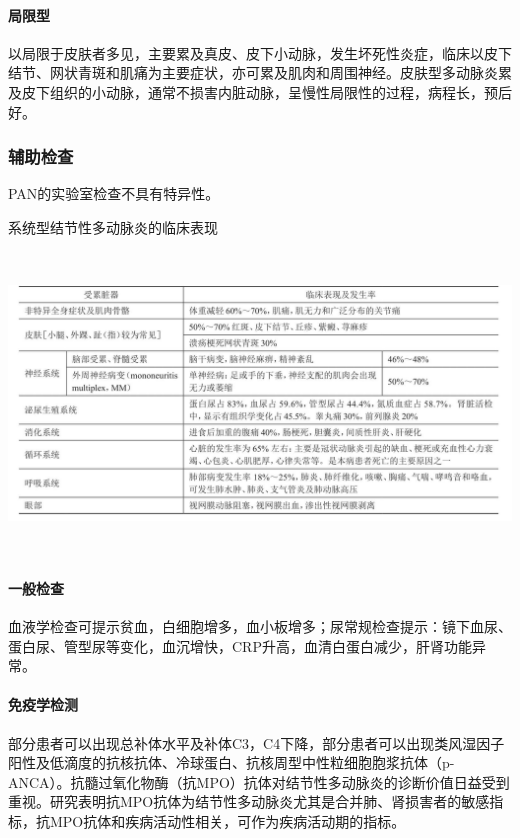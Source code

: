 \paragraph{局限型}

以局限于皮肤者多见，主要累及真皮、皮下小动脉，发生坏死性炎症，临床以皮下结节、网状青斑和肌痛为主要症状，亦可累及肌肉和周围神经。皮肤型多动脉炎累及皮下组织的小动脉，通常不损害内脏动脉，呈慢性局限性的过程，病程长，预后好。

\subsubsection{辅助检查}

PAN的实验室检查不具有特异性。

\begin{table}[htbp]
\centering
\caption{系统型结节性多动脉炎的临床表现}
\label{tab126-1}
\includegraphics[width=6.78125in,height=3.15625in]{./images/Image00501.jpg}
\end{table}

\paragraph{一般检查}

血液学检查可提示贫血，白细胞增多，血小板增多；尿常规检查提示：镜下血尿、蛋白尿、管型尿等变化，血沉增快，CRP升高，血清白蛋白减少，肝肾功能异常。

\paragraph{免疫学检测}

部分患者可以出现总补体水平及补体C3，C4下降，部分患者可以出现类风湿因子阳性及低滴度的抗核抗体、冷球蛋白、抗核周型中性粒细胞胞浆抗体（p-ANCA）。抗髓过氧化物酶（抗MPO）抗体对结节性多动脉炎的诊断价值日益受到重视。研究表明抗MPO抗体为结节性多动脉炎尤其是合并肺、肾损害者的敏感指标，抗MPO抗体和疾病活动性相关，可作为疾病活动期的指标。

